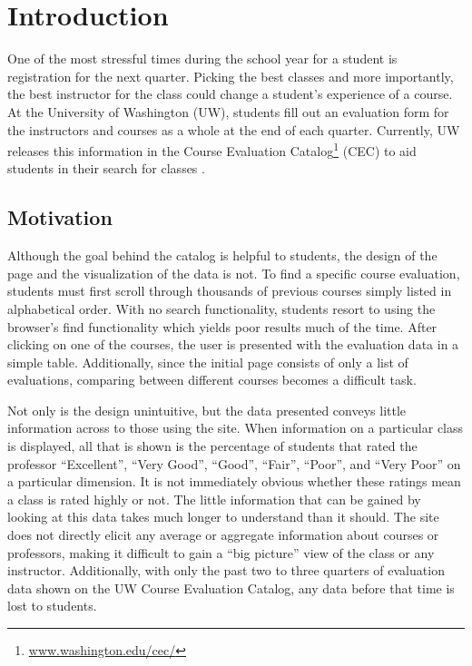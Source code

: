 \documentclass{chi2009}
\begin{document}

\section{Introduction}

One of the most stressful times during the school year for a student is registration for the next quarter.  Picking the best classes and more importantly, the best instructor for the class could change a student's experience of a course. At the University of Washington (UW), students fill out an evaluation form for the instructors and courses as a whole at the end of each quarter.  Currently, UW releases this information in the Course Evaluation Catalog\footnote{\href{www.washington.edu/cec/}{www.washington.edu/cec/}} (CEC) to aid students in their search for classes \cite{cec}.

\subsection{Motivation}
Although the goal behind the catalog is helpful to students, the design of the page and the visualization of the data is not.  To find a specific course evaluation, students must first scroll through thousands of previous courses simply listed in alphabetical order.  With no search functionality, students resort to using the browser's find functionality which yields poor results much of the time.  After clicking on one of the courses, the user is presented with the evaluation data in a simple table.  Additionally, since the initial page consists of only a list of evaluations, comparing between different courses becomes a difficult task.

Not only is the design unintuitive, but the data presented conveys little information across to those using the site. When information on a particular class is displayed, all that is shown is the percentage of students that rated the professor ``Excellent'', ``Very Good'', ``Good'', ``Fair'', ``Poor'', and ``Very Poor'' on a particular dimension. It is not immediately obvious whether these ratings mean a class is rated highly or not.  The little information that can be gained by looking at this data takes much longer to understand than it should.  The site does not directly elicit any average or aggregate information about courses or professors, making it difficult to gain a ``big picture'' view of the class or any instructor. Additionally, with only the past two to three quarters of evaluation data shown on the UW Course Evaluation Catalog, any data before that time is lost to students.
\end{document}
